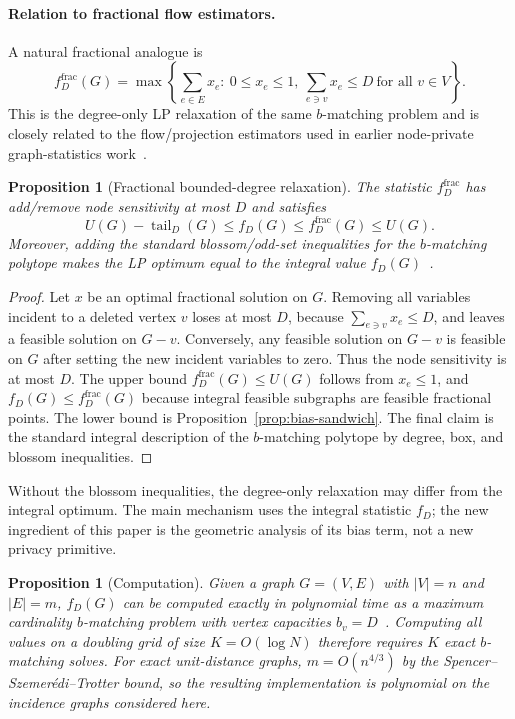 \documentclass[11pt]{article}
\newtheorem{proposition}[theorem]{Proposition}
\newcommand{\tail}{\operatorname{tail}}
\begin{document}
\paragraph{Relation to fractional flow estimators.}
A natural fractional analogue is
\[
f_D^{\mathrm{frac}}(G)=
\max\left\{\sum_{e\in E}x_e:\ 0\le x_e\le 1,\ 
\sum_{e\ni v}x_e\le D\ \text{for all }v\in V\right\}.
\]
This is the degree-only LP relaxation of the same \(b\)-matching problem and is closely related to the flow/projection estimators used in earlier node-private graph-statistics work~\cite{KNRS13}.

\begin{proposition}[Fractional bounded-degree relaxation]
\label{prop:fractional}
The statistic \(f_D^{\mathrm{frac}}\) has add/remove node sensitivity at most \(D\) and satisfies
\[
U(G)-\tail_D(G)\le f_D(G)\le f_D^{\mathrm{frac}}(G)\le U(G).
\]
Moreover, adding the standard blossom/odd-set inequalities for the \(b\)-matching polytope makes the LP optimum equal to the integral value \(f_D(G)\)~\cite[Chapter 31]{Schrijver03}.
\end{proposition}

\begin{proof}
Let \(x\) be an optimal fractional solution on \(G\). Removing all variables incident to a deleted vertex \(v\) loses at most \(D\), because \(\sum_{e\ni v}x_e\le D\), and leaves a feasible solution on \(G-v\). Conversely, any feasible solution on \(G-v\) is feasible on \(G\) after setting the new incident variables to zero. Thus the node sensitivity is at most \(D\). The upper bound \(f_D^{\mathrm{frac}}(G)\le U(G)\) follows from \(x_e\le 1\), and \(f_D(G)\le f_D^{\mathrm{frac}}(G)\) because integral feasible subgraphs are feasible fractional points. The lower bound is Proposition~\ref{prop:bias-sandwich}. The final claim is the standard integral description of the \(b\)-matching polytope by degree, box, and blossom inequalities.
\end{proof}

Without the blossom inequalities, the degree-only relaxation may differ from the integral optimum. The main mechanism uses the integral statistic \(f_D\); the new ingredient of this paper is the geometric analysis of its bias term, not a new privacy primitive.

\begin{proposition}[Computation]
\label{prop:computation}
Given a graph \(G=(V,E)\) with \(|V|=n\) and \(|E|=m\), \(f_D(G)\) can be computed exactly in polynomial time as a maximum cardinality \(b\)-matching problem with vertex capacities \(b_v=D\)~\cite{Schrijver03,Gabow18}. Computing all values on a doubling grid of size \(K=O(\log N)\) therefore requires \(K\) exact \(b\)-matching solves. For exact unit-distance graphs, \(m=O(n^{4/3})\) by the Spencer--Szemerédi--Trotter bound, so the resulting implementation is polynomial on the incidence graphs considered here.
\end{proposition}
\end{document}
